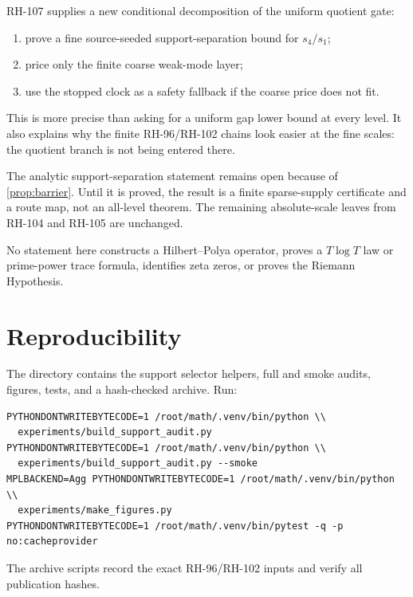 \documentclass[11pt]{article}
\theoremstyle{definition}
\theoremstyle{remark}
\begin{document}
RH-107 supplies a new conditional decomposition of the uniform quotient gate:
\begin{enumerate}[leftmargin=2.2em]
 \item prove a fine source-seeded support-separation bound for $s_4/s_1$;
 \item price only the finite coarse weak-mode layer;
 \item use the stopped clock as a safety fallback if the coarse price does
       not fit.
\end{enumerate}
This is more precise than asking for a uniform gap lower bound at every level.
It also explains why the finite RH-96/RH-102 chains look easier at the fine
scales: the quotient branch is not being entered there.

The analytic support-separation statement remains open because of
\cref{prop:barrier}.  Until it is proved, the result is a finite sparse-supply
certificate and a route map, not an all-level theorem.  The remaining
absolute-scale leaves from RH-104 and RH-105 are unchanged.

No statement here constructs a Hilbert--Polya operator, proves a $T\log T$
law or prime-power trace formula, identifies zeta zeros, or proves the
Riemann Hypothesis.

\section{Reproducibility}

The directory contains the support selector helpers, full and smoke audits,
figures, tests, and a hash-checked archive.  Run:
\begin{verbatim}
PYTHONDONTWRITEBYTECODE=1 /root/math/.venv/bin/python \\
  experiments/build_support_audit.py
PYTHONDONTWRITEBYTECODE=1 /root/math/.venv/bin/python \\
  experiments/build_support_audit.py --smoke
MPLBACKEND=Agg PYTHONDONTWRITEBYTECODE=1 /root/math/.venv/bin/python \\
  experiments/make_figures.py
PYTHONDONTWRITEBYTECODE=1 /root/math/.venv/bin/pytest -q -p no:cacheprovider
\end{verbatim}
The archive scripts record the exact RH-96/RH-102 inputs and verify all
publication hashes.



\end{document}
